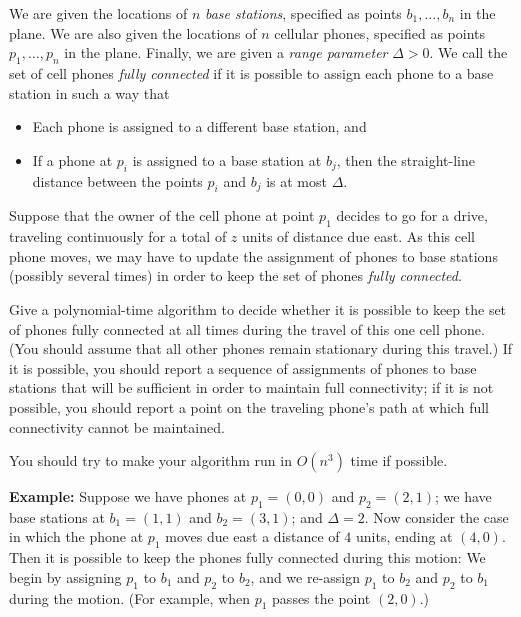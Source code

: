 \documentclass[12pt]{article}
\begin{document}
\begin{enumerate}
We are given the locations of $n$ {\em base stations},
specified as points $b_1, \ldots, b_n$
in the plane.
We are also given the locations of $n$ cellular phones,
specified as points $p_1, \ldots, p_n$ in the plane.
Finally, we are given a {\em range parameter} $\Delta > 0$.
We call the set of cell phones {\em fully connected} if
it is possible to assign each phone to a base station
in such a way that
\begin{itemize}
\item Each phone is assigned to a different base station, and
\item If a phone at $p_i$ is assigned to a base
station at $b_j$, then the straight-line distance between the
points $p_i$ and $b_j$ is at most $\Delta$.
\end{itemize}

Suppose that the owner of the cell phone at point $p_1$
decides to go for a drive, traveling
continuously for a total of $z$ units of distance due east.
As this cell phone moves, we may have to update the
assignment of phones to base stations (possibly several times)
in order to keep the set of phones
{\em fully connected}.

Give a polynomial-time algorithm to decide whether
it is possible to keep the set of phones fully connected
at all times during the travel of this one cell phone.
(You should assume that all other phones remain stationary
during this travel.)
If it is possible, you should report a sequence of assignments of phones
to base stations
that will be sufficient in order to maintain full connectivity;
if it is not possible, you should report a point on the traveling phone's path
at which full connectivity cannot be maintained.

You should try to make your algorithm run in $O(n^3)$ time if possible.

{\bf Example:} Suppose we have phones at $p_1 = (0,0)$
and $p_2 = (2,1)$; we have base stations at
$b_1 = (1,1)$ and $b_2 = (3,1)$; and $\Delta = 2$.
Now consider the case in which the phone at $p_1$ moves
due east a distance of $4$ units, ending at $(4,0)$.
Then it is possible to keep the phones fully connected
during this motion:
We begin by assigning $p_1$ to $b_1$ and $p_2$ to $b_2$,
and we re-assign $p_1$ to $b_2$ and $p_2$ to $b_1$ during the motion.
(For example, when $p_1$ passes the point $(2,0)$.)


\end{enumerate}
\end{document}
